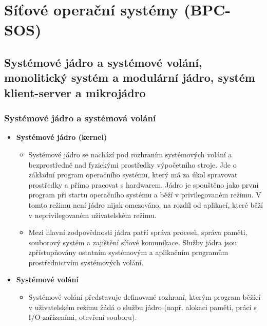 \section{Síťové operační systémy (BPC-SOS)}
\subsection{Systémové jádro a systémové volání, monolitický systém a modulární jádro, systém klient-server a mikrojádro}
    \subsubsection{Systémové jádro a systémová volání}
        \begin{itemize}
            \item \textbf{Systémové jádro (kernel)}
            \begin{itemize}
                \item Systémové jádro se nachází pod rozhraním systémových volání a bezprostředně nad fyzickými prostředky výpočetního stroje. Jde o základní program operačního systému, který má za úkol spravovat prostředky a přímo pracovat s hardwarem. Jádro je spouštěno jako první program při startu operačního systému a běží v privilegovaném režimu. V tomto režimu není jádro nijak omezováno, na rozdíl od aplikací, které běží v neprivilegovaném uživatelském režimu.
                \item Mezi hlavní zodpovědnosti jádra patří správa procesů, správa paměti, souborový systém a zajištění síťové komunikace. Služby jádra jsou zpřístupňovány ostatním systémovým a aplikačním programům prostřednictvím systémových volání.
            \end{itemize}
            \item \textbf{Systémové volání}
            \begin{itemize}
                \item Systémové volání představuje definované rozhraní, kterým program běžící v uživatelském režimu žádá o službu jádro (např. alokaci paměti, práci s I/O zařízeními, otevření souboru).
            \end{itemize}
        \end{itemize}
